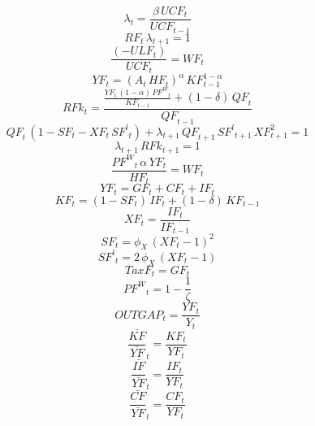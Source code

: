 \begin{dmath}
{\lambda}_{t}=\frac{{{\beta}}\, {UCF}_{t}}{{UCF}_{t-1}}
\end{dmath}
\begin{dmath}
{RF}_{t}\, {\lambda}_{t+1}=1
\end{dmath}
\begin{dmath}
\frac{\left(-{ULF}_{t}\right)}{{UCF}_{t}}={WF}_{t}
\end{dmath}
\begin{dmath}
{YF}_{t}=\left({A}_{t}\, {HF}_{t}\right)^{{{\alpha}}}\, {KF}_{t-1}^{1-{{\alpha}}}
\end{dmath}
\begin{dmath}
{RFk}_{t}=\frac{\frac{{YF}_{t}\, \left(1-{{\alpha}}\right)\, {PF^{W}}_{t}}{{KF}_{t-1}}+\left(1-{{\delta}}\right)\, {QF}_{t}}{{QF}_{t-1}}
\end{dmath}
\begin{dmath}
{QF}_{t}\, \left(1-{SF}_{t}-{XF}_{t}\, {SF^{l}}_{t}\right)+{\lambda}_{t+1}\, {QF}_{t+1}\, {SF^{l}}_{t+1}\, {XF}_{t+1}^{2}=1
\end{dmath}
\begin{dmath}
{\lambda}_{t+1}\, {RFk}_{t+1}=1
\end{dmath}
\begin{dmath}
\frac{{PF^{W}}_{t}\, {{\alpha}}\, {YF}_{t}}{{HF}_{t}}={WF}_{t}
\end{dmath}
\begin{dmath}
{YF}_{t}={GF}_{t}+{CF}_{t}+{IF}_{t}
\end{dmath}
\begin{dmath}
{KF}_{t}=\left(1-{SF}_{t}\right)\, {IF}_{t}+\left(1-{{\delta}}\right)\, {KF}_{t-1}
\end{dmath}
\begin{dmath}
{XF}_{t}=\frac{{IF}_{t}}{{IF}_{t-1}}
\end{dmath}
\begin{dmath}
{SF}_{t}={{\phi_{X}}}\, \left({XF}_{t}-1\right)^{2}
\end{dmath}
\begin{dmath}
{SF^{l}}_{t}=2\, {{\phi_{X}}}\, \left({XF}_{t}-1\right)
\end{dmath}
\begin{dmath}
{TaxF}_{t}={GF}_{t}
\end{dmath}
\begin{dmath}
{PF^{W}}_{t}=1-\frac{1}{{{\zeta}}}
\end{dmath}
\begin{dmath}
{OUTGAP}_{t}=\frac{{YF}_{t}}{{Y}_{t}}
\end{dmath}
\begin{dmath}
{\frac{\bar{KF}}{\bar{YF}}}_{t}=\frac{{KF}_{t}}{{YF}_{t}}
\end{dmath}
\begin{dmath}
{\frac{\bar{IF}}{\bar{YF}}}_{t}=\frac{{IF}_{t}}{{YF}_{t}}
\end{dmath}
\begin{dmath}
{\frac{\bar{CF}}{\bar{YF}}}_{t}=\frac{{CF}_{t}}{{YF}_{t}}
\end{dmath}
